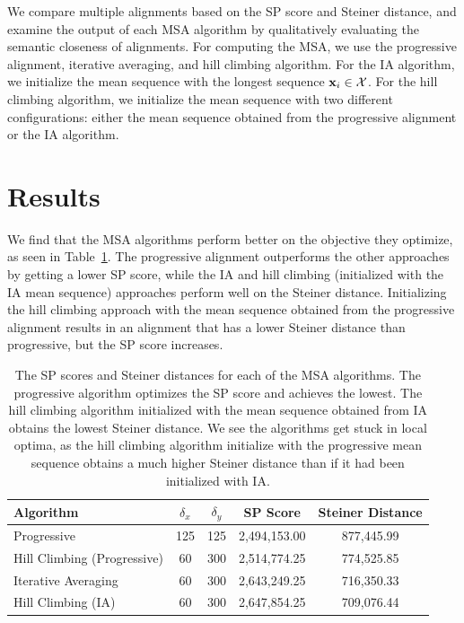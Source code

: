 \documentclass{article}
\begin{document}
We compare multiple alignments based on the SP score and Steiner distance,
and examine the output of each MSA algorithm by qualitatively evaluating the 
semantic closeness of alignments.
For computing the MSA, we use the progressive alignment, iterative averaging,
and hill climbing algorithm.
For the IA algorithm, we initialize the mean sequence with the longest sequence $\mathbf{x}_i \in \mathcal{X}$.
For the hill climbing algorithm, we initialize the mean sequence with
two different configurations:
either the mean sequence obtained from the progressive alignment or the IA algorithm.

\section{Results}
We find that the MSA algorithms perform better on the objective they optimize,
as seen in Table~\ref{tbl:sp_steiner}.
The progressive alignment outperforms the other approaches by getting a lower SP score,
while the IA and hill climbing (initialized with the IA mean sequence)
approaches perform well on the Steiner distance.
Initializing the hill climbing approach with the mean sequence obtained from 
the progressive alignment results in an alignment that has a lower Steiner distance
than progressive, but the SP score increases.

\begin{table}[h]
\centering
\begin{tabular}[h]{|l|c|c|c|c|}
\hline
\bf{Algorithm}              & $\delta_x$ & $\delta_y$ & \bf{SP Score} & \bf{Steiner Distance}\\
\hline
Progressive                 & 125        & 125        & 2,494,153.00  & 877,445.99 \\
Hill Climbing (Progressive) & 60         & 300        & 2,514,774.25  & 774,525.85\\
Iterative Averaging         & 60         & 300        & 2,643,249.25  & 716,350.33\\
Hill Climbing (IA)          & 60         & 300        & 2,647,854.25  & 709,076.44\\
\hline
\end{tabular}
\caption{
\label{tbl:sp_steiner}
The SP scores and Steiner distances for each of the MSA algorithms.
The progressive algorithm optimizes the SP score and achieves the lowest.
The hill climbing algorithm initialized with the mean sequence obtained from IA
obtains the lowest Steiner distance.
We see the algorithms get stuck in local optima, as the hill climbing algorithm
initialize with the progressive mean sequence obtains a much higher
Steiner distance than if it had been initialized with IA.
}
\end{table}
\end{document}

